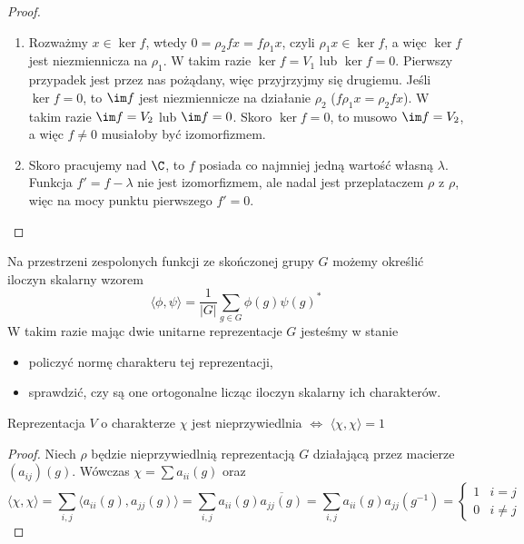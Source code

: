 \begin{proof}
  \begin{enumerate}
    \item Rozważmy $x\in\ker f$, wtedy $0=\rho_2 fx=f\rho_1 x$, czyli $\rho_1x\in \ker f$, a więc $\ker f$ jest niezmiennicza na $\rho_1$. W takim razie $\ker f=V_1$ lub $\ker f=0$. Pierwszy przypadek jest przez nas pożądany, więc przyjrzyjmy się drugiemu. Jeśli $\ker f=0$, to $\im f$ jest niezmiennicze na działanie $\rho_2$ ($f\rho_1 x=\rho_2 fx$). W takim razie $\im f=V_2$ lub $\im f=0$. Skoro $\ker f=0$, to musowo $\im f=V_2$, a więc $f\neq 0$ musiałoby być izomorfizmem.
    \item Skoro pracujemy nad $\C$, to $f$ posiada co najmniej jedną wartość własną $\lambda$. Funkcja $f'=f-\lambda$ nie jest izomorfizmem, ale nadal jest przeplataczem $\rho$ z $\rho$, więc na mocy punktu pierwszego $f'=0$.
  \end{enumerate}
\end{proof}

Na przestrzeni zespolonych funkcji ze skończonej grupy $G$ możemy określić iloczyn skalarny wzorem
$$\langle \phi, \psi\rangle=\frac{1}{|G|}\sum_{g\in G}\phi(g)\psi(g)^*$$
W takim razie mając dwie unitarne reprezentacje $G$ jesteśmy w stanie
\begin{itemize}
  \item policzyć normę charakteru tej reprezentacji,
  \item sprawdzić, czy są one ortogonalne licząc iloczyn skalarny ich charakterów.
\end{itemize}



\begin{lemma}{}{}
  Reprezentacja $V$ o charakterze $\chi$ jest nieprzywiedlnia $\iff$ $\langle\chi,\chi\rangle=1$
\end{lemma}

\begin{proof}
  Niech $\rho$ będzie nieprzywiedlnią reprezentacją $G$ działającą przez macierze $(a_{ij})(g)$. Wówczas $\chi=\sum a_{ii}(g)$ oraz
  $$\langle \chi, \chi\rangle=\sum_{i,j} \langle a_{ii}(g),a_{jj}(g)\rangle=\sum_{i,j}a_{ii}(g)\overline{a_{jj}(g)}=\sum_{i,j}a_{ii}(g)a_{jj}(g^{-1})=\begin{cases}1 & i=j\\ 0 & i\neq j\end{cases}$$
\end{proof}

